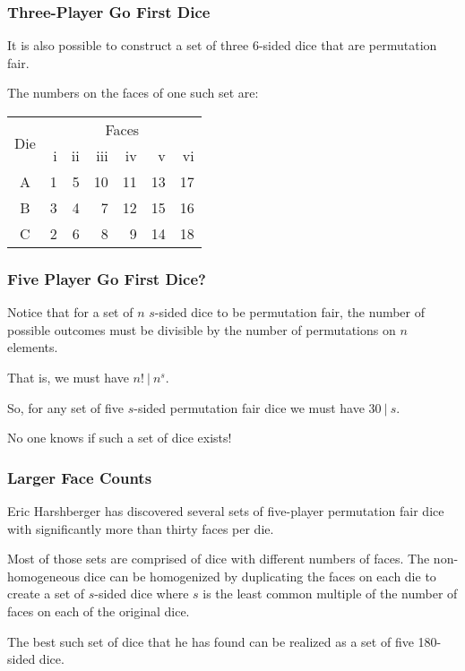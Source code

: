 \documentclass[aspectratio=169]{beamer}
\begin{document}
\begin{frame}[triangle=siiblue]
\frametitle{Three-Player Go First Dice}
It is also possible to construct a set of three 6-sided dice that are permutation fair. 

\vfill

The numbers on the faces of one such set are:
\begin{table}
\begin{tabular}{c rrrrrr} \toprule
\multirow{2}[2]{*}{Die} &  \multicolumn{6}{c}{Faces} \\ \cmidrule(lr){2-7}     
   & i & ii & iii & iv & v & vi \\ \midrule
A & 1 & 5 & 10 & 11 & 13 & 17 \\
B & 3 & 4 & 7 & 12 & 15 & 16 \\
C & 2 & 6 & 8 & 9 & 14 & 18 \\ \bottomrule
\end{tabular}
\end{table}
\end{frame}

\begin{frame}[triangle=siiblue]
\frametitle{Five Player Go First Dice?}
Notice that for a set of $n$ $s$-sided dice to be permutation fair,  the number of possible outcomes must be divisible by the number of permutations on $n$ elements.

\vfill

That is, we must have $n! \ \vert \ n^s$.

\vfill

So, for any set of five $s$-sided permutation fair dice we must have $ 30 \ \vert \ s$.

\vfill

No one knows if such a set of dice exists!
\end{frame}

\begin{frame}[triangle=siiblue]
\frametitle{Larger Face Counts}
Eric Harshberger has discovered several sets of five-player permutation fair dice with significantly more than thirty faces per die.

\vfill

Most of those sets are comprised of dice with different numbers of faces.  The non-homogeneous dice can be homogenized by duplicating the faces on each die to create a set of $s$-sided dice where $s$ is the least common multiple of the number of faces on each of the original dice.

\vfill

The best such set of dice that he has found can be realized as a set of five 180-sided dice.
\end{frame}
\end{document}
